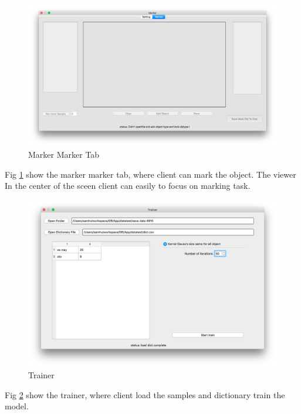\begin{center}
    \begin{figure}[H]
      \includegraphics[width=\textwidth]{Chapters/Fig/marker-marker}
      \caption{Marker Marker Tab}
      \label{fig:marker-marker}
    \end{figure}

  Fig \ref{fig:marker-marker} show the marker marker tab, where client can mark the object. The viewer In the center of the sceen client can easily to focus on marking task. \\

    \begin{figure}[H]
      \includegraphics[width=\textwidth]{Chapters/Fig/Trainer}
      \caption{Trainer}
      \label{fig:Trainer}
    \end{figure}

  Fig \ref{fig:Trainer} show the trainer, where client load the samples and dictionary train the model.\\
 

\end{center}
